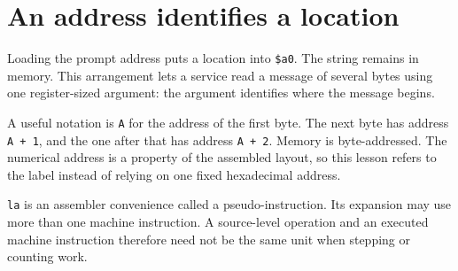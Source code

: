\section{An address identifies a
  location}\label{001-console-calculation-p04-an-address-identifies-a-location}

Loading the prompt address puts a location into \texttt{\$a0}. The
string remains in memory. This arrangement lets a service read a message
of several bytes using one register-sized argument: the argument
identifies where the message begins.

A useful notation is \texttt{A} for the address of the first byte. The
next byte has address \texttt{A\ +\ 1}, and the one after that has
address \texttt{A\ +\ 2}. Memory is byte-addressed. The numerical
address is a property of the assembled layout, so this lesson refers to
the label instead of relying on one fixed hexadecimal address.

\texttt{la} is an assembler convenience called a pseudo-instruction. Its
expansion may use more than one machine instruction. A source-level
operation and an executed machine instruction therefore need not be the
same unit when stepping or counting work.
